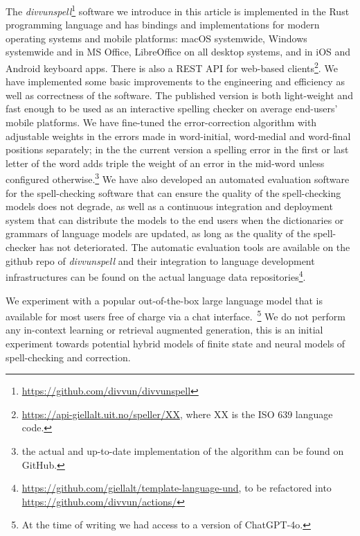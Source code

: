 \documentclass[free]{flammie}
\begin{document}
The \textit{divvunspell}\footnote{\url{https://github.com/divvun/divvunspell}}
software we introduce in this article is implemented in the Rust programming
language and has bindings and implementations for modern operating systems and
mobile platforms: macOS systemwide, Windows systemwide and in MS Office,
LibreOffice on all desktop systems, and in iOS and Android keyboard apps. There
is also a REST API for web-based
clients\footnote{\url{https://api-giellalt.uit.no/speller/XX}, where XX is the
ISO 639 language code.}.  We have implemented some basic improvements to the
engineering and efficiency as well as correctness of the software.  The
published version is both light-weight and fast enough to be used as an
interactive spelling checker on average end-users' mobile platforms.  We have
fine-tuned the error-correction algorithm with adjustable weights in the errors
made in word-initial, word-medial and word-final positions separately; in the
the current version a spelling error in the first or last letter of the word
adds triple the weight of an error in the mid-word unless configured
otherwise.\footnote{the actual and up-to-date implementation of the algorithm
can be found on GitHub.} We have also developed an automated evaluation software
for the spell-checking software that can ensure the quality of the
spell-checking models does not degrade, as well as a continuous integration and
deployment system that can distribute the models to the end users when the
dictionaries or grammars of language models are updated, as long as the quality
of the spell-checker has not deteriorated.  The automatic evaluation tools are
available on the github repo of \textit{divvunspell} and their integration to
language development infrastructures can be found on the actual language data
repositories\footnote{\url{https://github.com/giellalt/template-language-und},
to be refactored into \url{https://github.com/divvun/actions/}}.

We experiment with a popular out-of-the-box large language model that is
available for most users free of charge via a chat interface.~\footnote{At the
time of writing we had access to a version of ChatGPT-4o.} We do not perform any
in-context learning or retrieval augmented generation, this is an initial
experiment towards potential hybrid models of finite state and neural models of
spell-checking and correction.
\end{document}
